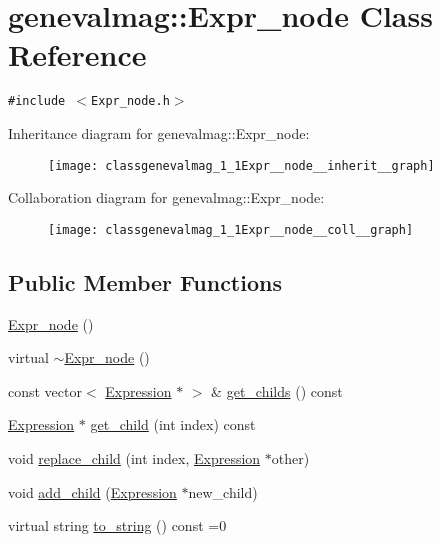 \hypertarget{classgenevalmag_1_1Expr__node}{
\section{genevalmag::Expr\_\-node Class Reference}
\label{classgenevalmag_1_1Expr__node}
}
{\tt \#include $<$Expr\_\-node.h$>$}

Inheritance diagram for genevalmag::Expr\_\-node:\nopagebreak
\begin{figure}[H]
\begin{center}
\leavevmode
\texttt{[image: classgenevalmag\_1\_1Expr\_\_node\_\_inherit\_\_graph]}
\end{center}
\end{figure}
Collaboration diagram for genevalmag::Expr\_\-node:\nopagebreak
\begin{figure}[H]
\begin{center}
\leavevmode
\texttt{[image: classgenevalmag\_1\_1Expr\_\_node\_\_coll\_\_graph]}
\end{center}
\end{figure}
\subsection*{Public Member Functions}
\begin{CompactItemize}
\item 
\hyperlink{classgenevalmag_1_1Expr__node_f8c84be806b49faef74651ec80f9d34d}{Expr\_\-node} ()
\item 
virtual \hyperlink{classgenevalmag_1_1Expr__node_ed3c4a68961a70c4f41bf100bfac7db9}{$\sim$Expr\_\-node} ()
\item 
const vector$<$ \hyperlink{classgenevalmag_1_1Expression}{Expression} $\ast$ $>$ \& \hyperlink{classgenevalmag_1_1Expr__node_35298ede3bb76a765ce4367a589383cc}{get\_\-childs} () const 
\item 
\hyperlink{classgenevalmag_1_1Expression}{Expression} $\ast$ \hyperlink{classgenevalmag_1_1Expr__node_fd22b5e20b8723e957587aafe4e8e724}{get\_\-child} (int index) const 
\item 
void \hyperlink{classgenevalmag_1_1Expr__node_951f8db517c231456781d10961ef8dba}{replace\_\-child} (int index, \hyperlink{classgenevalmag_1_1Expression}{Expression} $\ast$other)
\item 
void \hyperlink{classgenevalmag_1_1Expr__node_11c96ee7ecda3b52639b2f8879aafea2}{add\_\-child} (\hyperlink{classgenevalmag_1_1Expression}{Expression} $\ast$new\_\-child)
\item 
virtual string \hyperlink{classgenevalmag_1_1Expr__node_dea1d8fbc1b01f018e18cedad871f6a7}{to\_\-string} () const =0
\end{CompactItemize}
